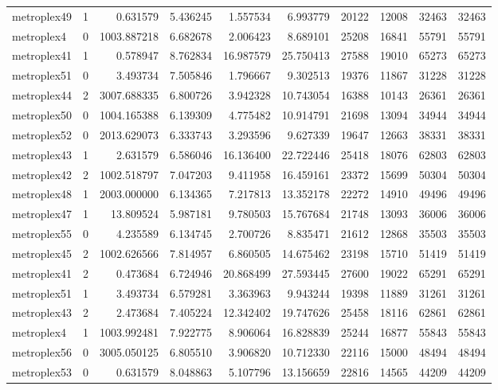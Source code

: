 \begin{longtable}{|l|r|r|r|r|r|r|r|r|r|}
metroplex49 & 1 & 0.631579 & 5.436245 & 1.557534 & 6.993779 & 20122 & 12008 & 32463 & 32463 \\
metroplex4 & 0 & 1003.887218 & 6.682678 & 2.006423 & 8.689101 & 25208 & 16841 & 55791 & 55791 \\
metroplex41 & 1 & 0.578947 & 8.762834 & 16.987579 & 25.750413 & 27588 & 19010 & 65273 & 65273 \\
metroplex51 & 0 & 3.493734 & 7.505846 & 1.796667 & 9.302513 & 19376 & 11867 & 31228 & 31228 \\
metroplex44 & 2 & 3007.688335 & 6.800726 & 3.942328 & 10.743054 & 16388 & 10143 & 26361 & 26361 \\
metroplex50 & 0 & 1004.165388 & 6.139309 & 4.775482 & 10.914791 & 21698 & 13094 & 34944 & 34944 \\
metroplex52 & 0 & 2013.629073 & 6.333743 & 3.293596 & 9.627339 & 19647 & 12663 & 38331 & 38331 \\
metroplex43 & 1 & 2.631579 & 6.586046 & 16.136400 & 22.722446 & 25418 & 18076 & 62803 & 62803 \\
metroplex42 & 2 & 1002.518797 & 7.047203 & 9.411958 & 16.459161 & 23372 & 15699 & 50304 & 50304 \\
metroplex48 & 1 & 2003.000000 & 6.134365 & 7.217813 & 13.352178 & 22272 & 14910 & 49496 & 49496 \\
metroplex47 & 1 & 13.809524 & 5.987181 & 9.780503 & 15.767684 & 21748 & 13093 & 36006 & 36006 \\
metroplex55 & 0 & 4.235589 & 6.134745 & 2.700726 & 8.835471 & 21612 & 12868 & 35503 & 35503 \\
metroplex45 & 2 & 1002.626566 & 7.814957 & 6.860505 & 14.675462 & 23198 & 15710 & 51419 & 51419 \\
metroplex41 & 2 & 0.473684 & 6.724946 & 20.868499 & 27.593445 & 27600 & 19022 & 65291 & 65291 \\
metroplex51 & 1 & 3.493734 & 6.579281 & 3.363963 & 9.943244 & 19398 & 11889 & 31261 & 31261 \\
metroplex43 & 2 & 2.473684 & 7.405224 & 12.342402 & 19.747626 & 25458 & 18116 & 62861 & 62861 \\
metroplex4 & 1 & 1003.992481 & 7.922775 & 8.906064 & 16.828839 & 25244 & 16877 & 55843 & 55843 \\
metroplex56 & 0 & 3005.050125 & 6.805510 & 3.906820 & 10.712330 & 22116 & 15000 & 48494 & 48494 \\
metroplex53 & 0 & 0.631579 & 8.048863 & 5.107796 & 13.156659 & 22816 & 14565 & 44209 & 44209 \\

\end{longtable}
